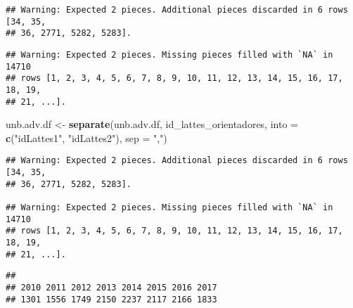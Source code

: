 \documentclass[]{article}
\newenvironment{Shaded}{\begin{snugshade}}{\end{snugshade}}
\newcommand{\KeywordTok}[1]{\textcolor[rgb]{0.13,0.29,0.53}{\textbf{#1}}}
\newcommand{\DataTypeTok}[1]{\textcolor[rgb]{0.13,0.29,0.53}{#1}}
\newcommand{\DecValTok}[1]{\textcolor[rgb]{0.00,0.00,0.81}{#1}}
\newcommand{\StringTok}[1]{\textcolor[rgb]{0.31,0.60,0.02}{#1}}
\newcommand{\CommentTok}[1]{\textcolor[rgb]{0.56,0.35,0.01}{\textit{#1}}}
\newcommand{\OtherTok}[1]{\textcolor[rgb]{0.56,0.35,0.01}{#1}}
\newcommand{\OperatorTok}[1]{\textcolor[rgb]{0.81,0.36,0.00}{\textbf{#1}}}
\newcommand{\NormalTok}[1]{#1}
\begin{document}
\begin{verbatim}
## Warning: Expected 2 pieces. Additional pieces discarded in 6 rows [34, 35,
## 36, 2771, 5282, 5283].
\end{verbatim}

\begin{verbatim}
## Warning: Expected 2 pieces. Missing pieces filled with `NA` in 14710
## rows [1, 2, 3, 4, 5, 6, 7, 8, 9, 10, 11, 12, 13, 14, 15, 16, 17, 18, 19,
## 21, ...].
\end{verbatim}

\begin{Shaded}
\begin{Highlighting}[]
\NormalTok{unb.adv.df <-}\StringTok{ }\KeywordTok{separate}\NormalTok{(unb.adv.df, id_lattes_orientadores, }\DataTypeTok{into =} \KeywordTok{c}\NormalTok{(}\StringTok{"idLattes1"}\NormalTok{, }\StringTok{"idLattes2"}\NormalTok{), }\DataTypeTok{sep =} \StringTok{","}\NormalTok{)}
\end{Highlighting}
\end{Shaded}

\begin{verbatim}
## Warning: Expected 2 pieces. Additional pieces discarded in 6 rows [34, 35,
## 36, 2771, 5282, 5283].

## Warning: Expected 2 pieces. Missing pieces filled with `NA` in 14710
## rows [1, 2, 3, 4, 5, 6, 7, 8, 9, 10, 11, 12, 13, 14, 15, 16, 17, 18, 19,
## 21, ...].
\end{verbatim}

\begin{Shaded}
\end{Shaded}

\begin{verbatim}
## 
## 2010 2011 2012 2013 2014 2015 2016 2017 
## 1301 1556 1749 2150 2237 2117 2166 1833
\end{verbatim}

\begin{Shaded}
\end{Shaded}
\end{document}
